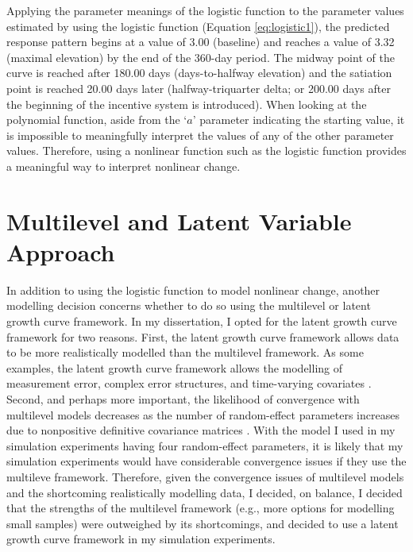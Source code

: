 \documentclass[
12pt, %
twoside,
english]{guelphthesis}
\begin{document}
\noindent Applying the parameter meanings of the logistic function to the parameter values estimated by using the logistic function (Equation \ref{eq:logistic1}), the predicted response pattern begins at a value of 3.00 (baseline) and reaches a value of 3.32 (maximal elevation) by the end of the 360-day period. The midway point of the curve is reached after 180.00 days (days-to-halfway elevation) and the satiation point is reached 20.00 days later (halfway-triquarter delta; or 200.00 days after the beginning of the incentive system is introduced). When looking at the polynomial function, aside from the `\(a\)' parameter indicating the starting value, it is impossible to meaningfully interpret the values of any of the other parameter values. Therefore, using a nonlinear function such as the logistic function provides a meaningful way to interpret nonlinear change.

\hypertarget{multilevel-and-latent-variable-approach}{%
\section{Multilevel and Latent Variable Approach}\label{multilevel-and-latent-variable-approach}}

In addition to using the logistic function to model nonlinear change, another modelling decision concerns whether to do so using the multilevel or latent growth curve framework. In my dissertation, I opted for the latent growth curve framework for two reasons. First, the latent growth curve framework allows data to be more realistically modelled than the multilevel framework. As some examples, the latent growth curve framework allows the modelling of measurement error, complex error structures, and time-varying covariates \autocite[for a review, see][]{mcneish2018}. Second, and perhaps more important, the likelihood of convergence with multilevel models decreases as the number of random-effect parameters increases due to nonpositive definitive covariance matrices \autocite[for a review, see][]{mcneish2020}. With the model I used in my simulation experiments having four random-effect parameters, it is likely that my simulation experiments would have considerable convergence issues if they use the multileve framework. Therefore, given the convergence issues of multilevel models and the shortcoming realistically modelling data, I decided, on balance, I decided that the strengths of the multilevel framework (e.g., more options for modelling small samples) were outweighed by its shortcomings, and decided to use a latent growth curve framework in my simulation experiments.
\end{document}
